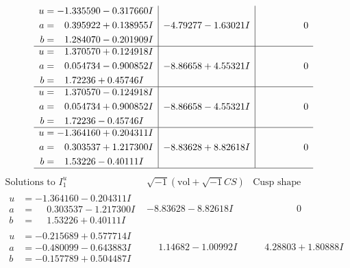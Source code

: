 \documentclass[1p]{elsarticle_modified}
\theoremstyle{definition}
\newcommand{\I}{\sqrt{-1}}
\begin{document}
$$\begin{array}{c|c|c}
\begin{aligned}
u &= -1.335590 - 0.317660 I \\
a &= \phantom{-}0.395922 + 0.138955 I \\
b &= \phantom{-}1.284070 - 0.201909 I\end{aligned}
 & -4.79277 - 1.63021 I & \phantom{-0.000000 } 0 \\ \hline\begin{aligned}
u &= \phantom{-}1.370570 + 0.124918 I \\
a &= \phantom{-}0.054734 - 0.900852 I \\
b &= \phantom{-}1.72236 + 0.45746 I\end{aligned}
 & -8.86658 + 4.55321 I & \phantom{-0.000000 } 0 \\ \hline\begin{aligned}
u &= \phantom{-}1.370570 - 0.124918 I \\
a &= \phantom{-}0.054734 + 0.900852 I \\
b &= \phantom{-}1.72236 - 0.45746 I\end{aligned}
 & -8.86658 - 4.55321 I & \phantom{-0.000000 } 0 \\ \hline\begin{aligned}
u &= -1.364160 + 0.204311 I \\
a &= \phantom{-}0.303537 + 1.217300 I \\
b &= \phantom{-}1.53226 - 0.40111 I\end{aligned}
 & -8.83628 + 8.82618 I & \phantom{-0.000000 } 0\\
 \hline 
 \end{array}$$\newpage$$\begin{array}{c|c|c}  
\text{Solutions to }I^u_{1}& \I (\text{vol} + \sqrt{-1}CS) & \text{Cusp shape}\\
 \hline 
\begin{aligned}
u &= -1.364160 - 0.204311 I \\
a &= \phantom{-}0.303537 - 1.217300 I \\
b &= \phantom{-}1.53226 + 0.40111 I\end{aligned}
 & -8.83628 - 8.82618 I & \phantom{-0.000000 } 0 \\ \hline\begin{aligned}
u &= -0.215689 + 0.577714 I \\
a &= -0.480099 - 0.643883 I \\
b &= -0.157789 + 0.504487 I\end{aligned}
 & \phantom{-}1.14682 - 1.00992 I & \phantom{-}4.28803 + 1.80888 I \\ \hline\begin{aligned}

\end{aligned}
\end{array}$$
\end{document}
